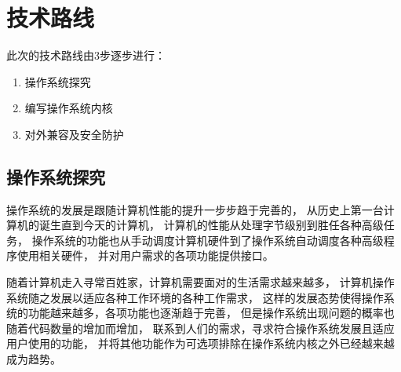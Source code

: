 \chapter{技术路线}

此次的技术路线由3步逐步进行：
\begin{enumerate}
    \item 操作系统探究
    \item 编写操作系统内核
    \item 对外兼容及安全防护
    \end{enumerate}

\section{操作系统探究}
操作系统的发展是跟随计算机性能的提升一步步趋于完善的，
从历史上第一台计算机的诞生直到今天的计算机，
计算机的性能从处理字节级别到胜任各种高级任务，
操作系统的功能也从手动调度计算机硬件到了操作系统自动调度各种高级程序使用相关硬件，
并对用户需求的各项功能提供接口。

随着计算机走入寻常百姓家，计算机需要面对的生活需求越来越多，
计算机操作系统随之发展以适应各种工作环境的各种工作需求，
这样的发展态势使得操作系统的功能越来越多，各项功能也逐渐趋于完善，
但是操作系统出现问题的概率也随着代码数量的增加而增加，
联系到人们的需求，寻求符合操作系统发展且适应用户使用的功能，
并将其他功能作为可选项排除在操作系统内核之外已经越来越成为趋势。

